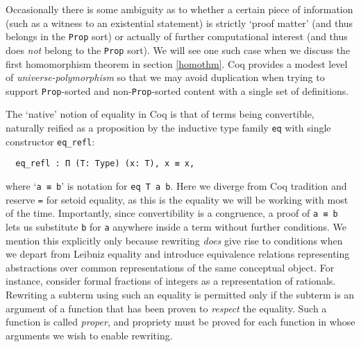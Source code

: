 \documentclass[a4paper,10pt,runningheads]{llncs}
\begin{document}
Occasionally there is some ambiguity as to whether a certain piece of information (such as a witness to an existential statement) is strictly `proof matter' (and thus belongs in the \lstinline|Prop| sort) or actually of further computational interest (and thus does \emph{not} belong to the \lstinline|Prop| sort). We will see one such case when we discuss the first homomorphism theorem in section \ref{homothm}. Coq provides a modest level of \emph{universe-polymorphism} so that we may avoid duplication when trying to support \lstinline|Prop|-sorted and non-\lstinline|Prop|-sorted content with a single set of definitions.



The `native' notion of equality in Coq is that of terms being convertible, naturally reified as a proposition by the inductive type family \lstinline|eq| with single constructor \lstinline|eq_refl|:
\begin{lstlisting}
  eq_refl : Π (T: Type) (x: T), x ≡ x,
\end{lstlisting}
where `\lstinline|a ≡ b|' is notation for \lstinline|eq T a b|. Here we diverge from Coq tradition and reserve \lstinline|=| for setoid equality, as this is the equality we will be working with most of the time. Importantly, since convertibility is a congruence, a proof of \lstinline|a ≡ b| lets us substitute \lstinline|b| for \lstinline|a| anywhere inside a term without further conditions. We mention this explicitly only because rewriting \emph{does} give rise to conditions when we depart from Leibniz equality and introduce equivalence relations representing abstractions over common representations of the same conceptual object. For instance, consider formal fractions of integers as a representation of rationals. Rewriting a subterm using such an equality is permitted only if the subterm is an argument of a function that has been proven to \emph{respect} the equality. Such a function is called \emph{proper}, and propriety must be proved for each function in whose arguments we wish to enable rewriting.
\end{document}

